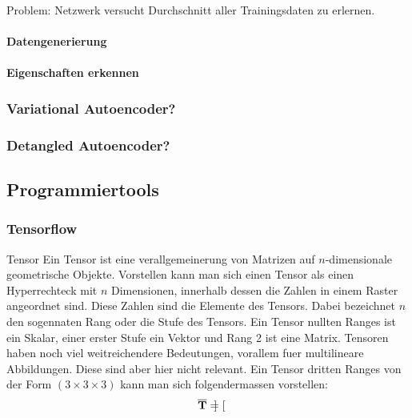 \documentclass[../main]{subfiles}
\begin{document}
Problem: Netzwerk versucht Durchschnitt aller Trainingsdaten zu erlernen.
\paragraph{Datengenerierung}
\paragraph{Eigenschaften erkennen}


\subsubsection{Variational Autoencoder?}
\subsubsection{Detangled Autoencoder?}

\subsection{Programmiertools}

\subsubsection{Tensorflow}
\begin{defbox}{Tensor}
  Ein Tensor ist eine verallgemeinerung von Matrizen auf
  $n$-dimensionale geometrische Objekte. Vorstellen kann man sich einen Tensor
  als einen Hyperrechteck mit $n$ Dimensionen, innerhalb dessen die Zahlen in
  einem Raster angeordnet sind. Diese Zahlen sind die Elemente des Tensors.
  Dabei bezeichnet $n$ den sogennaten Rang oder die Stufe des Tensors.
  Ein Tensor nullten Ranges ist ein Skalar, einer erster Stufe ein Vektor und
  Rang 2 ist eine Matrix.
  Tensoren haben noch viel weitreichendere Bedeutungen, vorallem fuer
  multilineare Abbildungen. Diese sind aber hier nicht relevant.
  \para{}
  Ein Tensor dritten Ranges von der Form $(3 \times 3 \times 3)$ kann man sich
  folgendermassen vorstellen:
  \begin{equation*}
    \overline{\mathbf{T}} = \begin{bmatrix}

    \end{bmatrix}
  \end{equation*}

\end{defbox}
\end{document}
